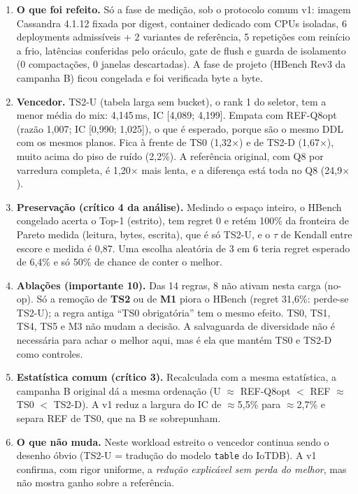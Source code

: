 \begin{enumerate}
\item \textbf{O que foi refeito.} Só a fase de medição, sob o protocolo comum v1: imagem Cassandra 4.1.12 fixada por digest, container dedicado com CPUs isoladas, 6 deployments admissíveis + 2 variantes de referência, 5 repetições com reinício a frio, \envrawrows{} latências conferidas pelo oráculo, gate de flush e guarda de isolamento (0 compactações, 0 janelas descartadas). A fase de projeto (HBench Rev3 da campanha B) ficou congelada e foi verificada byte a byte.
\item \textbf{Vencedor.} TS2-U (tabela larga sem bucket), o rank 1 do seletor, tem a menor média do mix: 4,145\,ms, IC [4,089; 4,199]. Empata com REF-Q8opt (razão 1,007; IC [0,990; 1,025]), o que é esperado, porque são o mesmo DDL com os mesmos planos. Fica à frente de TS0 (1,32$\times$) e de TS2-D (1,67$\times$), muito acima do piso de ruído (2,2\%). A referência original, com Q8 por varredura completa, é 1,20$\times$ mais lenta, e a diferença está toda no Q8 (24,9$\times$).
\item \textbf{Preservação (crítico 4 da análise).} Medindo o espaço inteiro, o HBench congelado acerta o Top-1 (estrito), tem regret 0 e retém 100\% da fronteira de Pareto medida (leitura, bytes, escrita), que é só TS2-U, e o $\tau$ de Kendall entre escore e medida é 0,87. Uma escolha aleatória de 3 em 6 teria regret esperado de 6,4\% e só 50\% de chance de conter o melhor.
\item \textbf{Ablações (importante 10).} Das 14 regras, 8 não ativam nesta carga (no-op). Só a remoção de \textbf{TS2} ou de \textbf{M1} piora o HBench (regret 31,6\%: perde-se TS2-U); a regra antiga ``TS0 obrigatória'' tem o mesmo efeito. TS0, TS1, TS4, TS5 e M3 não mudam a decisão. A salvaguarda de diversidade não é necessária para achar o melhor aqui, mas é ela que mantém TS0 e TS2-D como controles.
\item \textbf{Estatística comum (crítico 3).} Recalculada com a mesma estatística, a campanha B original dá a mesma ordenação (U $\approx$ REF-Q8opt $<$ REF $\approx$ TS0 $<$ TS2-D). A v1 reduz a largura do IC de $\approx$5,5\% para $\approx$2,7\% e separa REF de TS0, que na B se sobrepunham.
\item \textbf{O que não muda.} Neste workload estreito o vencedor continua sendo o desenho óbvio (TS2-U = tradução do modelo \texttt{table} do IoTDB). A v1 confirma, com rigor uniforme, a \emph{redução explicável sem perda do melhor}, mas não mostra ganho sobre a referência.
\end{enumerate}
